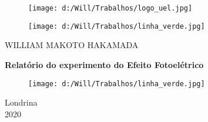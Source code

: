 \documentclass[a4paper, 12pt]{article}
\begin{document}
\begin{titlepage}
	\begin{center}
        \begin{figure}[!ht]
        \centering
        \texttt{[image: d:/Will/Trabalhos/logo\_uel.jpg]}
        \end{figure}
        \begin{figure}[!ht]
        \centering
        \texttt{[image: d:/Will/Trabalhos/linha\_verde.jpg]}
        \end{figure}
		\large WILLIAM MAKOTO HAKAMADA 
		
	
		\vspace{20pt}
        \vspace{95pt}
        \vspace{50pt}
        
        \textbf{\LARGE{Relatório do experimento do Efeito Fotoelétrico}} \\
        
        \vspace{15pt}
        \vspace{95pt}
        \vspace{30pt}
		\vspace{3,5cm}
	\end{center}
	 \begin{figure}[!ht]
        \centering
        \texttt{[image: d:/Will/Trabalhos/linha\_verde.jpg]}
        \end{figure}
	\begin{center}
			 Londrina\\
		 2020
			\end{center}
\end{titlepage}
\end{document}
